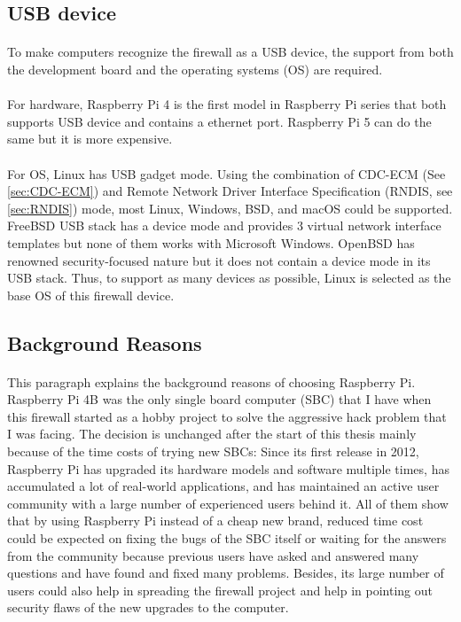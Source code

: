 \documentclass[mscthesis]{usiinfthesis}
\begin{document}
\subsection{USB device}
\paragraph{}
To make computers recognize the firewall as a USB device, the support from both the development board and the operating systems (OS) are required.
\paragraph{}
For hardware, Raspberry Pi 4 is the first model in Raspberry Pi series that both supports USB device and contains a ethernet port. Raspberry Pi 5 can do the same but it is more expensive.
\paragraph{}
For OS, Linux has USB gadget mode. Using the combination of CDC-ECM (See \cref{sec:CDC-ECM}) and Remote Network Driver Interface Specification (RNDIS, see \cref{sec:RNDIS}) mode, most Linux, Windows, BSD, and macOS could be supported. FreeBSD USB stack has a device mode and provides 3 virtual network interface templates but none of them works with Microsoft Windows\citep{freebsdhb:usb}. OpenBSD has renowned security-focused nature but it does not contain a device mode in its USB stack. Thus, to support as many devices as possible, Linux is selected as the base OS of this firewall device.

\subsection{Background Reasons}
\paragraph{}
This paragraph explains the background reasons of choosing Raspberry Pi. Raspberry Pi 4B was the only single board computer (SBC) that I have when this firewall started as a hobby project to solve the aggressive hack problem that I was facing. The decision is unchanged after the start of this thesis mainly because of the time costs of trying new SBCs: Since its first release in 2012, Raspberry Pi has upgraded its hardware models and software multiple times, has accumulated a lot of real-world applications, and has maintained an active user community with a large number of experienced users behind it. All of them show that by using Raspberry Pi instead of a cheap new brand, reduced time cost could be expected on fixing the bugs of the SBC itself or waiting for the answers from the community because previous users have asked and answered many questions and have found and fixed many problems. Besides, its large number of users could also help in spreading the firewall project and help in pointing out security flaws of the new upgrades to the computer.
\end{document}
